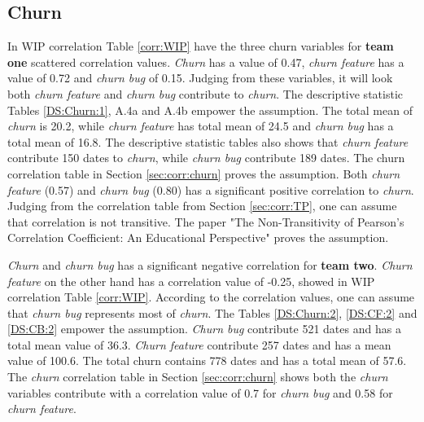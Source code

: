 \documentclass[UKenglish]{ifimaster}  %
\begin{document}
\subsection{Churn}
In WIP correlation Table \ref{corr:WIP} have the three churn variables for \textbf{team one} scattered correlation values. \textit{Churn} has a value of 0.47, \textit{churn feature} has a value of 0.72 and \textit{churn bug} of 0.15.  Judging from these variables, it will look both \textit{churn feature} and \textit{churn bug}  contribute to \textit{churn}. The descriptive statistic Tables \ref{DS:Churn:1}, A.4a and A.4b empower the assumption. The total mean of \textit{churn} is 20.2, while \textit{churn feature} has total mean of 24.5 and \textit{churn bug} has a total mean of 16.8. The descriptive statistic tables also shows that \textit{churn feature} contribute 150 dates to \textit{churn}, while \textit{churn bug} contribute 189 dates. The churn correlation table in Section \ref{sec:corr:churn} proves the assumption. Both \textit{churn feature} (0.57) and \textit{churn bug} (0.80) has a significant positive correlation to \textit{churn}. Judging from the correlation table from Section \ref{sec:corr:TP},  one can assume that correlation is not transitive. The paper "The Non-Transitivity of Pearson's Correlation Coefficient: An Educational Perspective" \parencite{corr:transitive} proves the assumption. 

\textit{Churn} and \textit{churn bug} has a significant negative correlation for \textbf{team two}. \textit{Churn feature} on the other hand has a correlation value of -0.25, showed in WIP correlation Table \ref{corr:WIP}. According to the correlation values, one can assume that \textit{churn bug} represents most of \textit{churn}. The Tables \ref{DS:Churn:2}, \ref{DS:CF:2} and \ref{DS:CB:2} empower the assumption. \textit{Churn bug} contribute 521 dates and has a total mean value of 36.3. \textit{Churn feature} contribute 257 dates and has a mean value of 100.6. The total churn contains 778 dates and has a total mean of 57.6. The \textit{churn} correlation table in Section \ref{sec:corr:churn} shows both the \textit{churn} variables contribute with a correlation value of 0.7 for \textit{churn bug} and 0.58 for \textit{churn feature}. 
\end{document}
